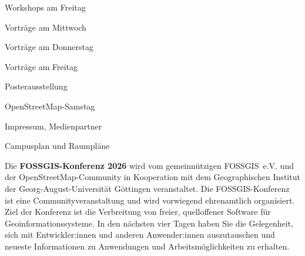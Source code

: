 \vspace*{\contentspace}%
\noindent Workshops am Freitag \dotfill \pageref{freitag-workshops}

\vspace*{\contentspace}%
\noindent Vorträge am Mittwoch \dotfill \pageref{mittwoch}

\vspace*{\contentspace}%
\noindent Vorträge am Donnerstag \dotfill \pageref{donnerstag}

\vspace*{\contentspace}%
\noindent Vorträge am Freitag \dotfill \pageref{freitag}

\vspace*{\contentspace}%
\noindent Posterausstellung \dotfill \pageref{donnerstag-poster}

\vspace*{\contentspace}%
\noindent OpenStreetMap-Samstag \dotfill \pageref{samstag}

\vspace*{\contentspace}%
\noindent Impressum, Medienpartner\dotfill \pageref{impressum}

%
\vspace*{\contentspace}%
\noindent Campusplan und Raumpläne \dotfill \pageref{kartenseiten}

\justifying

\vspace{0.2cm}
\noindent
Die {\bfseries FOSSGIS-Konferenz 2026} wird vom gemeinnützigen FOSSGIS~e.V. und der OpenStreetMap-Community in Kooperation mit
dem Geographischen Institut der Georg-August-Universität Göttingen veranstaltet.  Die FOSSGIS-Konferenz ist eine Communityveranstaltung und wird vorwiegend ehrenamtlich organisiert. Ziel der Konferenz ist die Verbreitung von freier, quelloffener Software für Geoinformationssysteme. In den nächsten vier Tagen haben Sie
die Gelegenheit, sich mit Entwickler:innen und anderen Anwender:innen auszutauschen und neueste Informationen zu Anwendungen und Arbeitsmöglichkeiten zu erhalten.


\newpage
